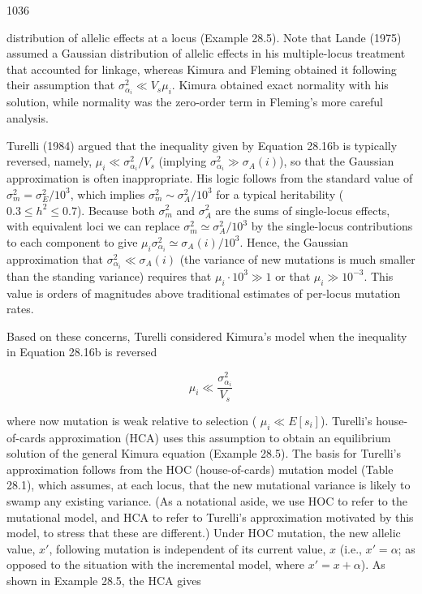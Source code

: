 \documentclass{article}
\begin{document}
1036

distribution of allelic effects at a locus (Example 28.5). Note that Lande (1975) assumed a Gaussian distribution of allelic effects in his multiple-locus treatment that accounted for linkage, whereas Kimura and Fleming obtained it following their assumption that  $ \sigma_{\alpha_i}^2 \ll V_s \mu_i $. Kimura obtained exact normality with his solution, while normality was the zero-order term in Fleming's more careful analysis.

Turelli (1984) argued that the inequality given by Equation 28.16b is typically reversed, namely,  $ \mu_i \ll \sigma_{\alpha_i}^2 / V_s $ (implying  $ \sigma_{\alpha_i}^2 \gg \sigma_A(i) $), so that the Gaussian approximation is often inappropriate. His logic follows from the standard value of  $ \sigma_m^2 = \sigma_E^2 / 10^3 $, which implies  $ \sigma_m^2 \sim \sigma_A^2 / 10^3 $ for a typical heritability ( $ 0.3 \leq h^2 \leq 0.7 $). Because both  $ \sigma_m^2 $ and  $ \sigma_A^2 $ are the sums of single-locus effects, with equivalent loci we can replace  $ \sigma_m^2 \simeq \sigma_A^2 / 10^3 $ by the single-locus contributions to each component to give  $ \mu_i \sigma_{\alpha_i}^2 \simeq \sigma_A(i) / 10^3 $. Hence, the Gaussian approximation that  $ \sigma_{\alpha_i}^2 \ll \sigma_A(i) $ (the variance of new mutations is much smaller than the standing variance) requires that  $ \mu_i \cdot 10^3 \gg 1 $ or that  $ \mu_i \gg 10^{-3} $. This value is orders of magnitudes above traditional estimates of per-locus mutation rates.

Based on these concerns, Turelli considered Kimura’s model when the inequality in Equation 28.16b is reversed

\begin{equation}
\mu_{i}\ll\frac{\sigma_{\alpha_{i}}^{2}}{V_{s}}
\tag{28.17}
\label{eq:28_17}
\end{equation}

where now mutation is weak relative to selection ( $ \mu_i \ll E[s_i] $). Turelli's house-of-cards approximation (HCA) uses this assumption to obtain an equilibrium solution of the general Kimura equation (Example 28.5). The basis for Turelli's approximation follows from the HOC (house-of-cards) mutation model (Table 28.1), which assumes, at each locus, that the new mutational variance is likely to swamp any existing variance. (As a notational aside, we use HOC to refer to the mutational model, and HCA to refer to Turelli's approximation motivated by this model, to stress that these are different.) Under HOC mutation, the new allelic value,  $ x' $, following mutation is independent of its current value,  $ x $ (i.e.,  $ x' = \alpha $; as opposed to the situation with the incremental model, where  $ x' = x + \alpha $). As shown in Example 28.5, the HCA gives
\end{document}

